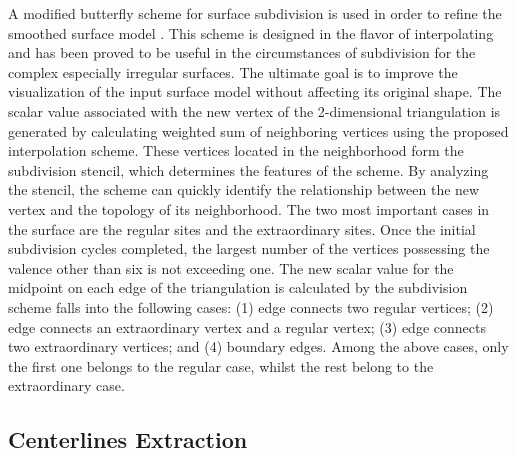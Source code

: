 A modified butterfly scheme for surface subdivision is used in order to refine the smoothed surface model \cite{Zorin1996}.
This scheme is designed in the flavor of interpolating and has been proved to be useful in the circumstances of subdivision for the complex especially irregular surfaces.
The ultimate goal is to improve the visualization of the input surface model without affecting its original shape.
The scalar value associated with the new vertex of the 2-dimensional triangulation is generated by calculating weighted sum of neighboring vertices using the proposed interpolation scheme. %
These vertices located in the neighborhood form the subdivision stencil, which determines the features of the scheme.
By analyzing the stencil, the scheme can quickly identify the relationship between the new vertex and the topology of its neighborhood.
The two most important cases in the surface are the regular sites and the extraordinary sites.
Once the initial subdivision cycles completed, the largest number of the vertices possessing the valence other than six is not exceeding one.
The new scalar value for the midpoint on each edge of the triangulation is calculated by the subdivision scheme falls into the following cases:
(1) edge connects two regular vertices;
(2) edge connects an extraordinary vertex and a regular vertex;
(3) edge connects two extraordinary vertices; and
(4) boundary edges.
Among the above cases, only the first one belongs to the regular case, whilst the rest belong to the extraordinary case.

\subsection{Centerlines Extraction}

